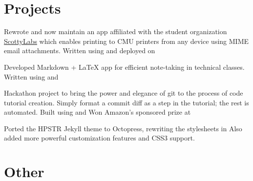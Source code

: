 \documentclass[]{deedy-resume-openfont}
\begin{document}
\begin{minipage}[t]{0.66\textwidth}

\section{Projects}
\descript{}
Rewrote and now maintain an app affiliated with the student organization \href{http://scottylabs.org}{ScottyLabs} which enables printing to CMU printers from any device using MIME email attachments. Written using  and  deployed on 
\sectionsep

\descript{}
Developed Markdown + \LaTeX{} app for efficient note-taking in technical classes. Written using  and 
\sectionsep

\descript{}
Hackathon project to bring the power and elegance of git to the process of code tutorial creation. Simply format a commit diff as a step in the tutorial; the rest is automated. Built using  and  Won Amazon's sponsored prize at 
\sectionsep

\descript{}
Ported the HPSTR Jekyll theme to Octopress, rewriting the stylesheets in  Also added more powerful customization features and CSS3 support.
\sectionsep


\section{Other} 
\sectionsep
{}
\sectionsep



\end{minipage}
\end{document}
